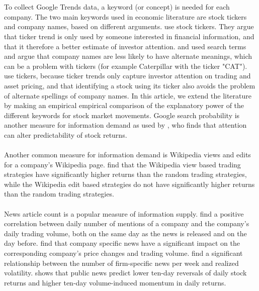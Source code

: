 \\\\
To collect Google Trends data, a keyword (or concept) is needed for each company. The two main keywords used in economic literature are stock tickers and company names, based on different arguments. \cite{joseph} use stock tickers. They argue that ticker trend is only used by someone interested in financial information, and that it therefore a better estimate of investor attention. \cite{bijl} and \cite{vlastakis} used search terms and argue that company names are less likely to have alternate meanings, which can be a problem with tickers (for example Caterpillar with the ticker "CAT"). \cite{engelberg} use tickers, because ticker trends only capture investor attention on trading and asset pricing, and that identifying a stock using its ticker also avoids the problem of alternate spellings of company names. In this article, we extend the literature by making an empirical empirical comparison of the explanatory power of the different keywords for stock market movements. Google search probability is another measure for information demand as used by \cite{vozlyublennaia}, who finds that attention can alter predictability of stock returns.       
\\\\
Another common measure for information demand is Wikipedia views and edits for a company's Wikipedia page. \cite{moat} find that the Wikipedia view based trading strategies have significantly higher returns than the random trading strategies, while the Wikipedia edit based strategies do not have significantly higher returns than the random trading strategies. 
\\\\
News article count is a popular measure of information supply. \cite{preis2013} find a positive correlation between daily number of mentions of a company and the company's daily trading volume, both on the same day as the news is released and on the day before. \cite{ryan} find that company specific news have a significant impact on the corresponding company's price changes and trading volume. \cite{vlastakis} find a significant relationship between the number of firm-specific news per week and realized volatility. \cite{tetlock} shows that public news predict lower ten-day reversals of daily stock returns and higher ten-day volume-induced momentum in daily returns.  
\\\\
